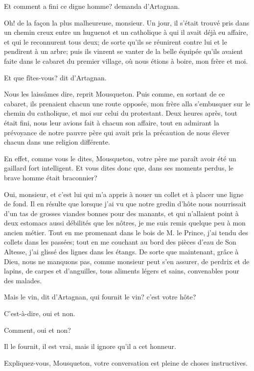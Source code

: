 \speak  Et comment a fini ce digne homme? demanda d'Artagnan. 

\speak  Oh! de la façon la plus malheureuse, monsieur. Un jour, il s'était trouvé pris dans un chemin creux entre un huguenot et un catholique à qui il avait déjà eu affaire, et qui le reconnurent tous deux; de sorte qu'ils se réunirent contre lui et le pendirent à un arbre; puis ils vinrent se vanter de la belle équipée qu'ils avaient faite dans le cabaret du premier village, où nous étions à boire, mon frère et moi. 

\speak  Et que fîtes-vous? dit d'Artagnan. 

\speak  Nous les laissâmes dire, reprit Mousqueton. Puis comme, en sortant de ce cabaret, ils prenaient chacun une route opposée, mon frère alla s'embusquer sur le chemin du catholique, et moi sur celui du protestant. Deux heures après, tout était fini, nous leur avions fait à chacun son affaire, tout en admirant la prévoyance de notre pauvre père qui avait pris la précaution de nous élever chacun dans une religion différente. 

\speak  En effet, comme vous le dites, Mousqueton, votre père me paraît avoir été un gaillard fort intelligent. Et vous dites donc que, dans ses moments perdus, le brave homme était braconnier? 

\speak  Oui, monsieur, et c'est lui qui m'a appris à nouer un collet et à placer une ligne de fond. Il en résulte que lorsque j'ai vu que notre gredin d'hôte nous nourrissait d'un tas de grosses viandes bonnes pour des manants, et qui n'allaient point à deux estomacs aussi débilités que les nôtres, je me suis remis quelque peu à mon ancien métier. Tout en me promenant dans le bois de M. le Prince, j'ai tendu des collets dans les passées; tout en me couchant au bord des pièces d'eau de Son Altesse, j'ai glissé des lignes dans les étangs. De sorte que maintenant, grâce à Dieu, nous ne manquons pas, comme monsieur peut s'en assurer, de perdrix et de lapins, de carpes et d'anguilles, tous aliments légers et sains, convenables pour des malades. 

\speak  Mais le vin, dit d'Artagnan, qui fournit le vin? c'est votre hôte? 

\speak  C'est-à-dire, oui et non. 

\speak  Comment, oui et non? 

\speak  Il le fournit, il est vrai, mais il ignore qu'il a cet honneur. 

\speak  Expliquez-vous, Mousqueton, votre conversation est pleine de choses instructives. 

